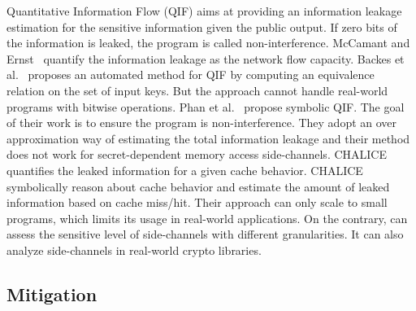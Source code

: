 Quantitative Information Flow (QIF) aims at providing an information
leakage estimation for the sensitive information given the public
output. If zero bits of the information is leaked, the program is
called non-interference. McCamant and Ernst~\cite{McCamantE2008} quantify the
information leakage as the network flow
capacity. Backes et al.~\cite{5207642} proposes an automated method 
for QIF by computing an equivalence relation on the set of input keys.
But the approach cannot handle real-world programs with bitwise operations.
Phan et al.~\cite{Phan:2012:SQI:2382756.2382791} propose symbolic
QIF. The goal of their work is to ensure the program is
non-interference. They adopt an over approximation way of estimating
the total information leakage and their method does not work for
secret-dependent memory access
side-channels. CHALICE~\cite{Chattopadhyay:2017:QIL:3127041.3127044}
quantifies the leaked information for a given cache behavior. CHALICE 
symbolically reason about cache behavior and estimate the amount
of leaked information based on cache miss/hit.
Their approach can only scale to small programs, 
which limits its usage in real-world applications.
On the contrary, \tool{} can assess the sensitive level of 
side-channels with different granularities. It can also analyze
side-channels in real-world crypto libraries. 

\subsection{Mitigation}
